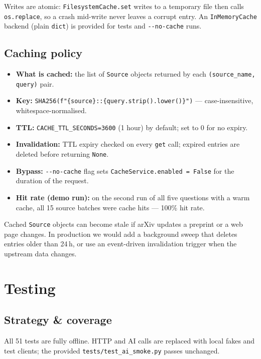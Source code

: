 \documentclass[11pt,a4paper]{article}
\begin{document}
Writes are atomic: \texttt{FilesystemCache.set} writes to a temporary file then calls \texttt{os.replace}, so a crash mid-write never leaves a corrupt entry. An \texttt{InMemoryCache} backend (plain \texttt{dict}) is provided for tests and \texttt{-{}-no-cache} runs.

\subsection{Caching policy}

\begin{itemize}[noitemsep]
  \item \textbf{What is cached:} the list of \texttt{Source} objects returned by each \texttt{(source\_name, query)} pair.
  \item \textbf{Key:} \texttt{SHA256(f"\{source\}::\{query.strip().lower()\}")} --- case-insensitive, whitespace-normalised.
  \item \textbf{TTL:} \texttt{CACHE\_TTL\_SECONDS=3600} (1 hour) by default; set to 0 for no expiry.
  \item \textbf{Invalidation:} TTL expiry checked on every \texttt{get} call; expired entries are deleted before returning \texttt{None}.
  \item \textbf{Bypass:} \texttt{-{}-no-cache} flag sets \texttt{CacheService.enabled = False} for the duration of the request.
  \item \textbf{Hit rate (demo run):} on the second run of all five questions with a warm cache, all 15 source batches were cache hits --- 100\% hit rate.
\end{itemize}

Cached \texttt{Source} objects can become stale if arXiv updates a preprint or a web page changes. In production we would add a background sweep that deletes entries older than 24\,h, or use an event-driven invalidation trigger when the upstream data changes.

\section{Testing}\label{sec:testing}

\subsection{Strategy \& coverage}

All 51 tests are fully offline. HTTP and AI calls are replaced with local fakes and test clients; the provided \texttt{tests/test\_ai\_smoke.py} passes unchanged.
\end{document}
